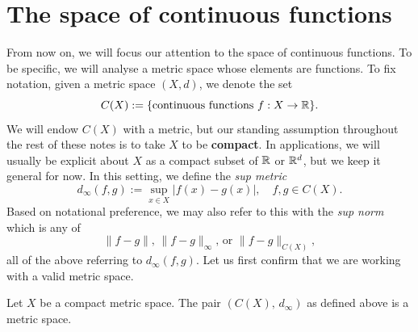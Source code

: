 \section{The space of continuous functions}
\label{sec:C^0}
From now on, we will focus our attention to the space of continuous functions. To be specific, we will analyse a metric space whose elements are functions. To fix notation, given a metric space $(X,d)$, we denote the set
\[
C(X):=\{\text{continuous functions }f:X\to \mathbb{R}\}.
\]
We will endow $C(X)$ with a metric, but our standing assumption throughout the rest of these notes is to take $X$ to be \textbf{compact}. In applications, we will usually be explicit about $X$ as a compact subset of $\mathbb{R}$ or $\mathbb{R}^d$, but we keep it general for now. In this setting, we define the \textit{sup metric}
\[
d_\infty(f,g):= \sup_{x\in X}|f(x) - g(x)|,\quad f,g\in C(X).
\]
Based on notational preference, we may also refer to this with the \textit{sup norm} which is any of
\[
\|f-g\|,\,\|f-g\|_{\infty},\,\text{or }\|f-g\|_{C(X)},
\]
all of the above referring to $d_\infty(f,g)$. Let us first confirm that we are working with a valid metric space.
\begin{prop}
	Let $X$ be a compact metric space. The pair $(C(X),\,d_\infty)$ as defined above is a metric space.
\end{prop}

